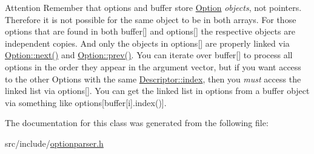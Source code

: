 \begin{DoxyAttention}{Attention}
Remember that {\ttfamily options} and {\ttfamily buffer} store \hyperlink{classxmem_1_1config_1_1third__party_1_1_option}{Option} {\itshape objects}, not pointers. Therefore it is not possible for the same object to be in both arrays. For those options that are found in both {\ttfamily buffer}\mbox{[}\mbox{]} and {\ttfamily options}\mbox{[}\mbox{]} the respective objects are independent copies. And only the objects in {\ttfamily options}\mbox{[}\mbox{]} are properly linked via \hyperlink{classxmem_1_1config_1_1third__party_1_1_option_af9c5d2de03863bbcdc05a1d6771f1f36}{Option\+::next()} and \hyperlink{classxmem_1_1config_1_1third__party_1_1_option_a51c55046e8f111be3e329f798d0f72b9}{Option\+::prev()}. You can iterate over {\ttfamily buffer}\mbox{[}\mbox{]} to process all options in the order they appear in the argument vector, but if you want access to the other Options with the same \hyperlink{structxmem_1_1config_1_1third__party_1_1_descriptor_aacf3d44f35c61f22be65da078f60734b}{Descriptor\+::index}, then you {\itshape must} access the linked list via {\ttfamily options}\mbox{[}\mbox{]}. You can get the linked list in options from a buffer object via something like {\ttfamily options}\mbox{[}buffer\mbox{[}i\mbox{]}.index()\mbox{]}. 
\end{DoxyAttention}


The documentation for this class was generated from the following file\+:\begin{DoxyCompactItemize}
\item 
src/include/\hyperlink{optionparser_8h}{optionparser.\+h}\end{DoxyCompactItemize}
